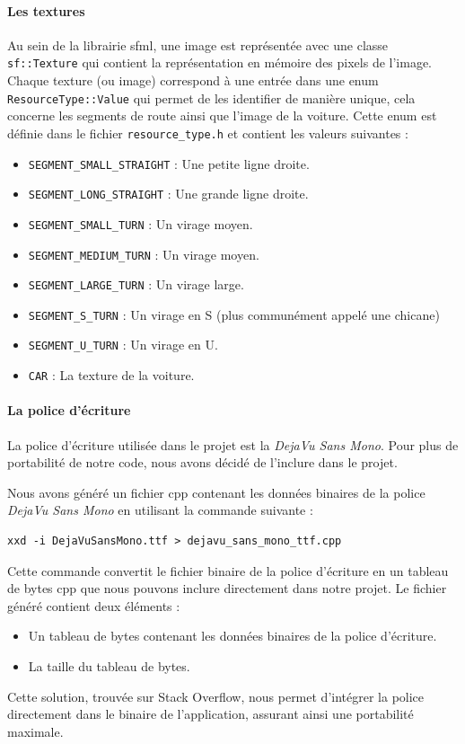 \paragraph{Les textures}
Au sein de la librairie \gls{sfml}, une image est représentée avec une classe \texttt{sf::Texture}\cite{sfml_sf_texture} qui contient la représentation en mémoire des pixels de l'image.
Chaque texture (ou image) correspond à une entrée dans une enum \texttt{ResourceType::Value} qui permet de les identifier de manière unique, cela concerne les segments de route ainsi que l'image de la voiture.
Cette enum est définie dans le fichier \texttt{resource\_type.h} et contient les valeurs suivantes :
\begin{itemize}
    \item \texttt{SEGMENT\_SMALL\_STRAIGHT} : Une petite ligne droite.
    \item \texttt{SEGMENT\_LONG\_STRAIGHT} : Une grande ligne droite.
    \item \texttt{SEGMENT\_SMALL\_TURN} : Un virage moyen.
    \item \texttt{SEGMENT\_MEDIUM\_TURN} : Un virage moyen.
    \item \texttt{SEGMENT\_LARGE\_TURN} : Un virage large.
    \item \texttt{SEGMENT\_S\_TURN} : Un virage en S (plus communément appelé une chicane)
    \item \texttt{SEGMENT\_U\_TURN} : Un virage en U\@.
    \item \texttt{CAR} : La texture de la voiture.
\end{itemize}

\paragraph{La police d'écriture}
La police d'écriture utilisée dans le projet est la \textit{DejaVu Sans Mono}.
Pour plus de portabilité de notre code, nous avons décidé de l'inclure dans le projet.

Nous avons généré un fichier \gls{cpp} contenant les données binaires de la police \textit{DejaVu Sans Mono} en utilisant la commande suivante :
\begin{lstlisting}[style=BashStyle,label={lst:generation_dejavusansmonottf_h}]
xxd -i DejaVuSansMono.ttf > dejavu_sans_mono_ttf.cpp
\end{lstlisting}
Cette commande convertit le fichier binaire de la police d'écriture en un tableau de bytes \gls{cpp} que nous pouvons inclure directement dans notre projet.
Le fichier généré contient deux éléments :
\begin{itemize}
    \item Un tableau de bytes contenant les données binaires de la police d'écriture.
    \item La taille du tableau de bytes.
\end{itemize}
Cette solution, trouvée sur Stack Overflow\cite{stackoverflow_embed_font}, nous permet d'intégrer la police directement dans le binaire de l'application, assurant ainsi une portabilité maximale.

